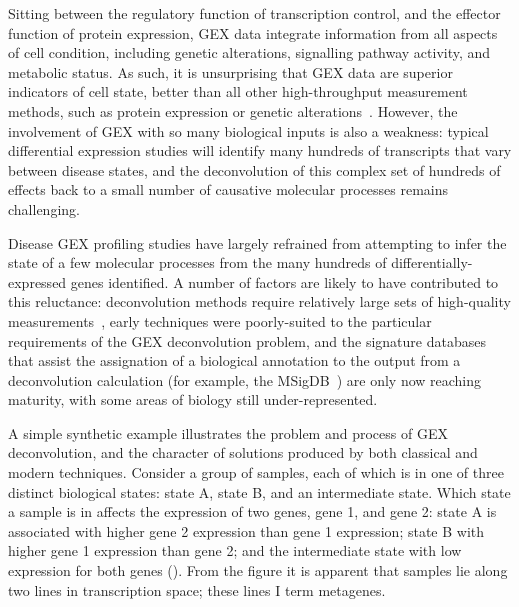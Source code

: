 \documentclass[dissertation.tex]{subfiles}
\begin{document}
Sitting between the regulatory function of transcription control, and the effector function of protein expression, \gls{GEX} data integrate information from all aspects of cell condition, including genetic alterations, signalling pathway activity, and metabolic status.  As such, it is unsurprising that \gls{GEX} data are superior indicators of cell state, better than all other high-throughput measurement methods, such as protein expression or genetic alterations~\cite{Ray2014}.  However, the involvement of \gls{GEX} with so many biological inputs is also a weakness: typical differential expression studies will identify many hundreds of transcripts that vary between disease states, and the deconvolution of this complex set of hundreds of effects back to a small number of causative molecular processes remains challenging.

Disease \gls{GEX} profiling studies have largely refrained from attempting to infer the state of a few molecular processes from the many hundreds of differentially-expressed genes identified.  A number of factors are likely to have contributed to this reluctance: deconvolution methods require relatively large sets of high-quality measurements~\cite{MacCallum1999}, early techniques were poorly-suited to the particular requirements of the \gls{GEX} deconvolution problem, and the signature databases that assist the assignation of a biological annotation to the output from a deconvolution calculation (for example, the \acrshort{MSigDB}~\cite{Subramanian2005}) are only now reaching maturity, with some areas of biology still under-represented.

A simple synthetic example illustrates the problem and process of \gls{GEX} deconvolution, and the character of solutions produced by both classical and modern techniques.  Consider a group of samples, each of which is in one of three distinct biological states: state A, state B, and an intermediate state.  Which state a sample is in affects the expression of two genes, gene 1, and gene 2: state A is associated with higher gene 2 expression than gene 1 expression; state B with higher gene 1 expression than gene 2; and the intermediate state with low expression for both genes ().  From the figure it is apparent that samples lie along two lines in transcription space; these lines I term metagenes.
\end{document}
